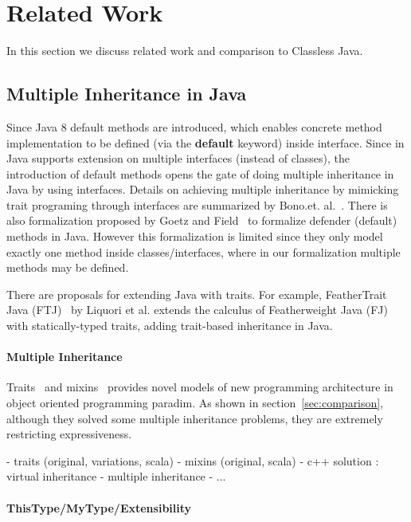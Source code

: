 \section{Related Work}\label{sec:related}
In this section we discuss related work and comparison to Classless Java.

\subsection{Multiple Inheritance in Java}
Since Java 8 default methods are introduced, which enables concrete method
implementation to be defined (via the \textbf{default} keyword) inside
interface. Since in Java supports extension on multiple interfaces (instead of
classes), the introduction of default methods opens the gate of doing multiple
inheritance in Java by using interfaces. Details on achieving multiple
inheritance by mimicking trait programing through interfaces are summarized by
Bono.et. al.~\cite{bono14}. There is also formalization proposed by
Goetz and Field~\cite{goetz12fdefenders} to formalize defender (default) methods
in Java. However this formalization is limited since they only model exactly one
method inside classes/interfaces, where in our formalization multiple methods
may be defined.

There are proposals for extending Java with traits. For example, FeatherTrait
Java (FTJ)~\cite{Liquori08ftj} by Liquori et al. extends the calculus of
Featherweight Java (FJ)~\cite{Igarashi01FJ} with statically-typed traits, adding
trait-based inheritance in Java. 

\paragraph{Multiple Inheritance}
Traits~\cite{} and mixins~\cite{} provides novel models of new programming
architecture in object oriented programming paradim. As shown in
section~\ref{sec:comparison}, although they solved some multiple inheritance
problems, they are extremely restricting expressiveness.


- traits (original, variations, scala)
- mixins (original, scala)
- c++ solution : virtual inheritance
- multiple inheritance
- ...

\paragraph{ThisType/MyType/Extensibility}

